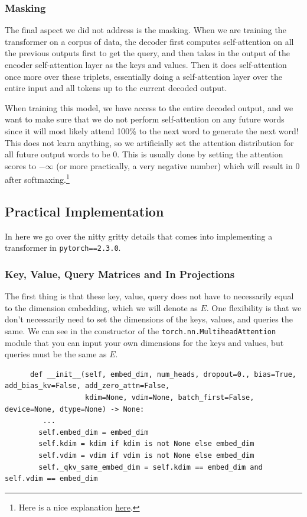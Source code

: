 \documentclass{article}
\begin{document}
  \subsubsection{Masking}

    The final aspect we did not address is the masking. When we are training the transformer on a corpus of data, the decoder first computes self-attention on all the previous outputs first to get the query, and then takes in the output of the encoder self-attention layer as the keys and values. Then it does self-attention once more over these triplets, essentially doing a self-attention layer over the entire input and all tokens up to the current decoded output. 

    When training this model, we have access to the entire decoded output, and we want to make sure that we do not perform self-attention on any future words since it will most likely attend 100\% to the next word to generate the next word! This does not learn anything, so we artificially set the attention distribution for all future output words to be $0$. This is usually done by setting the attention scores to $-\infty$ (or more practically, a very negative number) which will result in $0$ after softmaxing.\footnote{Here is a nice explanation \href{https://stackoverflow.com/questions/58127059/how-to-understand-masked-multi-head-attention-in-transformer}{here}.}

\subsection{Practical Implementation}

  In here we go over the nitty gritty details that comes into implementing a transformer in \texttt{pytorch==2.3.0}. 

  \subsubsection{Key, Value, Query Matrices and In Projections}

    The first thing is that these key, value, query does not have to necessarily equal to the dimension embedding, which we will denote as $E$. One flexibility is that we don't necessarily need to set the dimensions of the keys, values, and queries the same. We can see in the constructor of the \texttt{torch.nn.MultiheadAttention} module that you can input your own dimensions for the keys and values, but queries must be the same as $E$. 
    \begin{lstlisting}
      def __init__(self, embed_dim, num_heads, dropout=0., bias=True, add_bias_kv=False, add_zero_attn=False,
                   kdim=None, vdim=None, batch_first=False, device=None, dtype=None) -> None:
         ... 
        self.embed_dim = embed_dim
        self.kdim = kdim if kdim is not None else embed_dim
        self.vdim = vdim if vdim is not None else embed_dim
        self._qkv_same_embed_dim = self.kdim == embed_dim and self.vdim == embed_dim
    \end{lstlisting}
\end{document}

